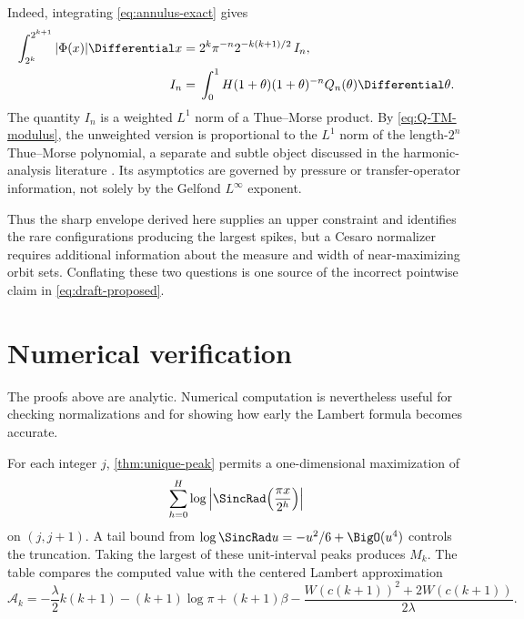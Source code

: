 \documentclass[11pt,oneside]{article}
\theoremstyle{definition}
\theoremstyle{remark}
\newcommand{\PhiF}{\Phi}
\begin{document}
Indeed, integrating \eqref{eq:annulus-exact} gives
\begin{equation}
\begin{split}
 \int_{2^k}^{2^{k+1}}|\PhiF(x)|\Differential x
 ={}&2^k\pi^{-n}2^{-k(k+1)/2}\,I_n,\\
 I_n={}&\int_0^1
 H(1+\theta)(1+\theta)^{-n}Q_n(\theta)\Differential\theta.
\end{split}
\label{eq:annulus-L1-reduction}
\end{equation}
The quantity \(I_n\) is a weighted \(L^1\) norm of a Thue--Morse product.
By \eqref{eq:Q-TM-modulus}, the unweighted version is proportional to the
\(L^1\) norm of the length-\(2^n\) Thue--Morse polynomial, a separate and
subtle object discussed in the harmonic-analysis literature
\cite{queffelec2018}.  Its asymptotics are governed by pressure or
transfer-operator information, not solely by the Gelfond \(L^\infty\)
exponent.

Thus the sharp envelope derived here supplies an upper constraint and
identifies the rare configurations producing the largest spikes, but a
Cesaro normalizer requires additional information about the measure and
width of near-maximizing orbit sets.  Conflating these two questions is one
source of the incorrect pointwise claim in \eqref{eq:draft-proposed}.

\section{Numerical verification}
\label{sec:numerics}

The proofs above are analytic.  Numerical computation is nevertheless useful
for checking normalizations and for showing how early the Lambert formula
becomes accurate.

For each integer \(j\), \cref{thm:unique-peak} permits a one-dimensional
maximization of
\[
 \sum_{h=0}^{H}\log\left|
 \SincRad\!\left(\frac{\pi x}{2^h}\right)\right|
\]
on \((j,j+1)\).  A tail bound from
\(
 \log\SincRad u=-u^2/6+\BigO(u^4)
\)
controls the truncation.  Taking the largest of these unit-interval peaks
produces \(M_k\).  The table compares the computed value with the centered
Lambert approximation
\begin{equation}
 \mathcal A_k=
 -\frac\lambda2k(k+1)-(k+1)\log\pi+(k+1)\beta
 -\frac{W(c(k+1))^2+2W(c(k+1))}{2\lambda}.
 \label{eq:centered-numerical-approx}
\end{equation}
\end{document}
